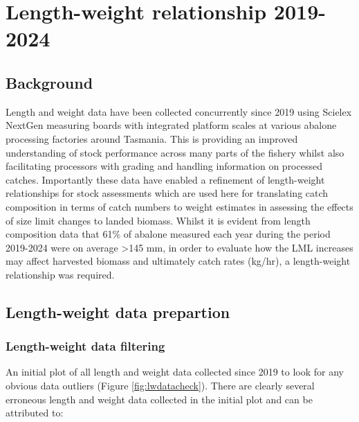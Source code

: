 \documentclass[
]{article}
\begin{document}
\section{Length-weight relationship 2019-2024}\label{length-weight-relationship-2019-2024}

\subsection{Background}\label{background-1}

Length and weight data have been collected concurrently since 2019 using Scielex NextGen measuring boards with integrated platform scales at various abalone processing factories around Tasmania. This is providing an improved understanding of stock performance across many parts of the fishery whilst also facilitating processors with grading and handling information on processed catches. Importantly these data have enabled a refinement of length-weight relationships for stock assessments which are used here for translating catch composition in terms of catch numbers to weight estimates in assessing the effects of size limit changes to landed biomass. Whilst it is evident from length composition data that 61\% of abalone measured each year during the period 2019-2024 were on average \textgreater145 mm, in order to evaluate how the LML increases may affect harvested biomass and ultimately catch rates (kg/hr), a length-weight relationship was required.

\subsection{Length-weight data prepartion}\label{length-weight-data-prepartion}

\subsubsection{Length-weight data filtering}\label{length-weight-data-filtering}

An initial plot of all length and weight data collected since 2019 to look for any obvious data outliers (Figure \ref{fig:lwdatacheck}). There are clearly several erroneous length and weight data collected in the initial plot and can be attributed to:
\end{document}
